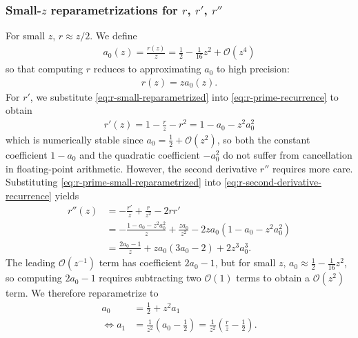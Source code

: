 \documentclass{article}
\begin{document}
\subsubsection{Small-$z$ reparametrizations for $r$, $r'$, $r''$}\label{sec:bessel-ratio-small-z}

For small $z$, $r \approx z/2$.
We define
%
\begin{align}\label{eq:a0-small-z}
  a_0(z) = \frac{r(z)}{z} = \frac{1}{2} - \frac{1}{16}z^2 + \mathcal{O}(z^4)
\end{align}
%
so that computing $r$ reduces to approximating $a_0$ to high precision:
%
\begin{align}\label{eq:r-small-reparametrized}
  \boxed{r(z) = z a_0(z).}
\end{align}
%
For $r'$, we substitute \cref{eq:r-small-reparametrized} into \cref{eq:r-prime-recurrence} to obtain
%
\begin{align}\label{eq:r-prime-small-reparametrized}
  \boxed{r'(z) = 1 - \frac{r}{z} - r^2 = 1 - a_0 - z^2 a_0^2}
\end{align}
%
which is numerically stable since $a_0 = \frac{1}{2} + \mathcal{O}(z^2)$, so both the constant coefficient $1 - a_0$ and the quadratic coefficient $-a_0^2$ do not suffer from cancellation in floating-point arithmetic.
However, the second derivative $r''$ requires more care.
Substituting \cref{eq:r-prime-small-reparametrized} into \cref{eq:r-second-derivative-recurrence} yields
%
\begin{align}
  r''(z) & = -\frac{r'}{z} + \frac{r}{z^2} - 2 r r'                                             \\
         & = -\frac{1 - a_0 - z^2 a_0^2}{z} + \frac{z a_0}{z^2} -  2 z a_0(1 - a_0 - z^2 a_0^2) \\
         & = \frac{2 a_0 - 1}{z} + z a_0 (3 a_0 - 2) + 2 z^3 a_0^3.
\end{align}
%
The leading $\mathcal{O}(z^{-1})$ term has coefficient $2a_0 - 1$, but for small $z$, $a_0 \approx \frac{1}{2} - \frac{1}{16}z^2$, so computing $2a_0 - 1$ requires subtracting two $\mathcal{O}(1)$ terms to obtain a $\mathcal{O}(z^2)$ term.
We therefore reparametrize to
%
\begin{align}
  a_0                 & = \frac{1}{2} + z^2 a_1 \label{eq:a0-reparametrized}                                                          \\
  \Leftrightarrow a_1 & = \frac{1}{z^2} (a_0 - \frac{1}{2}) = \frac{1}{z^2} (\frac{r}{z} - \frac{1}{2}). \label{eq:a1-reparametrized}
\end{align}
\end{document}
